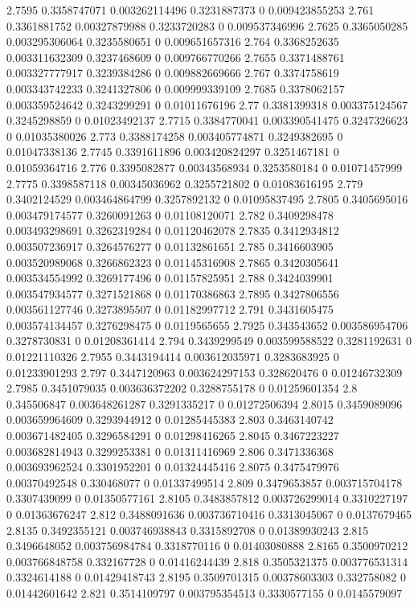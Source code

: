 {2.7595 0.3358747071 0.003262114496 0.3231887373 0 0.009423855253
2.761 0.3361881752 0.00327879988 0.3233720283 0 0.009537346996
2.7625 0.3365050285 0.003295306064 0.3235580651 0 0.009651657316
2.764 0.3368252635 0.003311632309 0.3237468609 0 0.009766770266
2.7655 0.3371488761 0.003327777917 0.3239384286 0 0.009882669666
2.767 0.3374758619 0.003343742233 0.3241327806 0 0.009999339109
2.7685 0.3378062157 0.003359524642 0.3243299291 0 0.01011676196
2.77 0.3381399318 0.003375124567 0.3245298859 0 0.01023492137
2.7715 0.3384770041 0.003390541475 0.3247326623 0 0.01035380026
2.773 0.3388174258 0.003405774871 0.3249382695 0 0.01047338136
2.7745 0.3391611896 0.003420824297 0.3251467181 0 0.01059364716
2.776 0.3395082877 0.00343568934 0.3253580184 0 0.01071457999
2.7775 0.3398587118 0.00345036962 0.3255721802 0 0.01083616195
2.779 0.3402124529 0.003464864799 0.3257892132 0 0.01095837495
2.7805 0.3405695016 0.003479174577 0.3260091263 0 0.01108120071
2.782 0.3409298478 0.003493298691 0.3262319284 0 0.01120462078
2.7835 0.3412934812 0.003507236917 0.3264576277 0 0.01132861651
2.785 0.3416603905 0.003520989068 0.3266862323 0 0.01145316908
2.7865 0.3420305641 0.003534554992 0.3269177496 0 0.01157825951
2.788 0.3424039901 0.003547934577 0.3271521868 0 0.01170386863
2.7895 0.3427806556 0.003561127746 0.3273895507 0 0.01182997712
2.791 0.3431605475 0.003574134457 0.3276298475 0 0.0119565655
2.7925 0.343543652 0.003586954706 0.3278730831 0 0.01208361414
2.794 0.3439299549 0.003599588522 0.3281192631 0 0.01221110326
2.7955 0.3443194414 0.003612035971 0.3283683925 0 0.01233901293
2.797 0.3447120963 0.003624297153 0.328620476 0 0.01246732309
2.7985 0.3451079035 0.003636372202 0.3288755178 0 0.01259601354
2.8 0.345506847 0.003648261287 0.3291335217 0 0.01272506394
2.8015 0.3459089096 0.003659964609 0.3293944912 0 0.01285445383
2.803 0.3463140742 0.003671482405 0.3296584291 0 0.01298416265
2.8045 0.3467223227 0.003682814943 0.3299253381 0 0.01311416969
2.806 0.3471336368 0.003693962524 0.3301952201 0 0.01324445416
2.8075 0.3475479976 0.00370492548 0.330468077 0 0.01337499514
2.809 0.3479653857 0.003715704178 0.3307439099 0 0.01350577161
2.8105 0.3483857812 0.003726299014 0.3310227197 0 0.01363676247
2.812 0.3488091636 0.003736710416 0.3313045067 0 0.0137679465
2.8135 0.3492355121 0.003746938843 0.3315892708 0 0.01389930243
2.815 0.3496648052 0.003756984784 0.3318770116 0 0.01403080888
2.8165 0.3500970212 0.003766848758 0.332167728 0 0.01416244439
2.818 0.3505321375 0.003776531314 0.3324614188 0 0.01429418743
2.8195 0.3509701315 0.00378603303 0.332758082 0 0.01442601642
2.821 0.3514109797 0.003795354513 0.3330577155 0 0.0145579097
}
